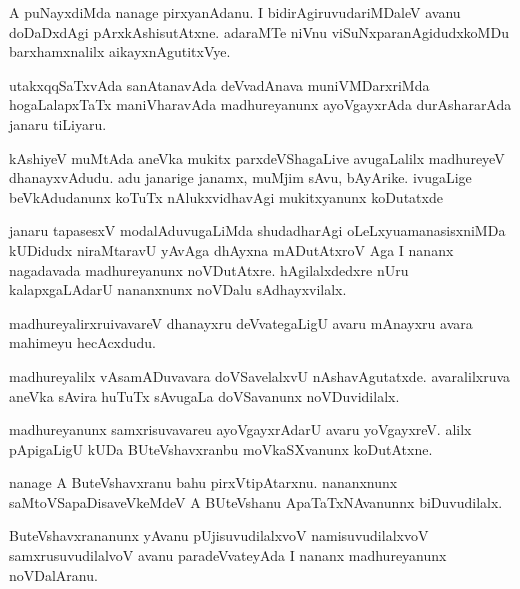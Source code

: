 \documentclass{article}
\begin{document}
\begin{mn}%
A puNayxdiMda nanage pirxyanAdanu. I  bidirAgiruvudariMDaleV avanu doDaDxdAgi 
pArxkAshisutAtxne. adaraMTe niVnu viSuNxparanAgidudxkoMDu barxhamxnalilx aikayxnAgutitxVye.
\end{mn}

\begin{mn}%
utakxqqSaTxvAda sanAtanavAda deVvadAnava muniVMDarxriMda hogaLalapxTaTx maniVharavAda  
madhureyanunx ayoVgayxrAda durAshararAda janaru tiLiyaru.
\end{mn}

\begin{mn}%
kAshiyeV muMtAda aneVka mukitx parxdeVShagaLive avugaLalilx madhureyeV dhanayxvAdudu. adu 
janarige janamx, muMjim sAvu, bAyArike. ivugaLige beVkAdudanunx koTuTx nAlukxvidhavAgi 
mukitxyanunx koDutatxde
\end{mn}

\begin{mn}%
janaru tapasesxV modalAduvugaLiMda shudadharAgi oLeLxyuamanasisxniMDa kUDidudx niraMtaravU 
yAvAga dhAyxna mADutAtxroV Aga I nananx nagadavada madhureyanunx noVDutAtxre. 
hAgilalxdedxre nUru kalapxgaLAdarU nananxnunx noVDalu sAdhayxvilalx.
\end{mn}

\begin{mn}%
madhureyalirxruivavareV dhanayxru deVvategaLigU avaru mAnayxru avara mahimeyu hecAcxdudu.
\end{mn}

\begin{mn}%
madhureyalilx vAsamADuvavara doVSavelalxvU nAshavAgutatxde. avaralilxruva aneVka sAvira 
huTuTx sAvugaLa doVSavanunx noVDuvidilalx.
\end{mn}

\begin{mn}%
madhureyanunx samxrisuvavareu ayoVgayxrAdarU avaru yoVgayxreV. alilx pApigaLigU kUDa 
BUteVshavxranbu moVkaSXvanunx koDutAtxne.
\end{mn}

\begin{mn}%
nanage A ButeVshavxranu bahu pirxVtipAtarxnu. nananxnunx saMtoVSapaDisaveVkeMdeV A 
BUteVshanu ApaTaTxNAvanunnx biDuvudilalx.
\end{mn}

\begin{mn}%
ButeVshavxrananunx yAvanu pUjisuvudilalxvoV namisuvudilalxvoV samxrusuvudilalvoV avanu 
paradeVvateyAda I nananx madhureyanunx noVDalAranu.
\end{mn}
\end{document}
